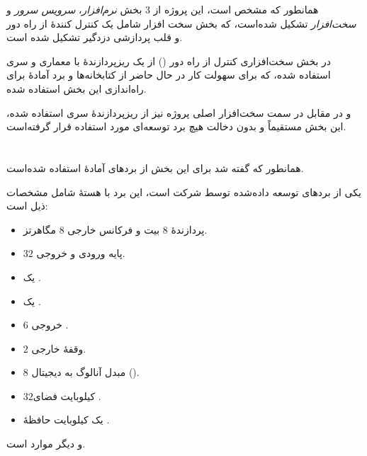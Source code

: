 \label{chap5}

همانطور که مشخص است، این پروژه از $3$ بخش \emph{نرم‌افزار}، \emph{سرویس
	 سرور} و \emph{سخت‌افزار} تشکیل شده‌است، که بخش سخت افزار شامل یک کنترل کنندهٔ از راه دور و قلب پردازشی دزدگیر تشکیل شده است.

در بخش سخت‌افزاری کنترل از راه دور
()
از یک ریزپردازندهٔ با معماری  و سری
 استفاده شده، که برای سهولت کار در حال حاضر از کتابخانه‌ها و برد آمادهٔ‌  برای راه‌اندازی این بخش استفاده شده.

و در مقابل در سمت سخت‌افزار اصلی پروژه نیز از ریزپردازندهٔ
سری  استفاده شده، این بخش مستقیماً
و بدون دخالت هیچ برد توسعه‌ای مورد استفاده قرار گرفته‌است.


\section{ }\label{sec1:chap5}

همانطور که گفته شد برای این بخش از برد‌های آمادهٔ 
استفاده شده‌است.

 یکی از برد‌های توسعه داده‌شده توسط شرکت  است، این برد با هستهٔ  شامل مشخصات ذیل است:

\begin{itemize}[nosep]
    \item پردازندهٔ $8$ بیت و فرکانس خارجی $8$ مگاهرتز.
    \item $32$ پایه ورودی و خروجی.
    \item یک .
    \item یک .
    \item $6$ خروجی .
    \item $2$ وقفهٔ خارجی.
    \item $8$ مبدل آنالوگ به دیجیتال ().
    \item $32$کیلوبایت فضای .
    \item یک کیلوبایت حافظهٔ .
\end{itemize}
و دیگر موارد است.
\cite{atmega328p_datasheet}


